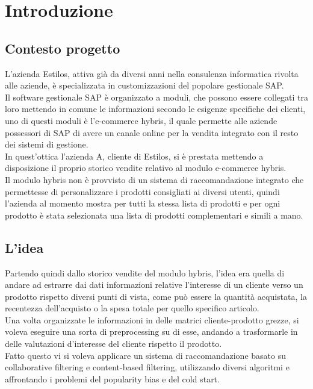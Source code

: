 
\chapter{Introduzione}
\section{Contesto progetto}
L'azienda Estilos, attiva già da diversi anni nella consulenza informatica rivolta alle aziende, è specializzata in customizzazioni del popolare gestionale SAP.\\
Il software gestionale SAP è organizzato a moduli, che possono essere collegati tra loro mettendo in comune le informazioni secondo le esigenze specifiche dei clienti, uno di questi moduli è l'e-commerce hybris, il quale permette alle aziende possessori di SAP di avere un canale online per la vendita integrato con il resto dei sistemi di gestione.\\ 
In quest'ottica l'azienda A, cliente di Estilos, si è prestata mettendo a disposizione il proprio storico vendite relativo al modulo e-commerce hybris.\\
Il modulo hybris non è provvisto di un sistema di raccomandazione integrato che permettesse di personalizzare i prodotti consigliati ai diversi utenti, quindi l'azienda al momento mostra per tutti la stessa lista di prodotti e per ogni prodotto è stata selezionata una lista di prodotti complementari e simili a mano.

\section{L'idea}
Partendo quindi dallo storico vendite del modulo hybris, l'idea era quella di andare ad estrarre dai dati informazioni relative l'interesse di un cliente verso un prodotto rispetto diversi punti di vista, come può essere la quantità acquistata, la recentezza dell'acquisto o la spesa totale per quello specifico articolo.\\
Una volta organizzate le informazioni in delle matrici cliente-prodotto grezze, si voleva eseguire una sorta di preprocessing su di esse, andando a trasformarle in delle valutazioni d'interesse del cliente rispetto il prodotto. \\
Fatto questo vi si voleva applicare un sistema di raccomandazione basato su collaborative filtering e content-based filtering, utilizzando diversi algoritmi e affrontando i problemi del popularity bias e del cold start. 

